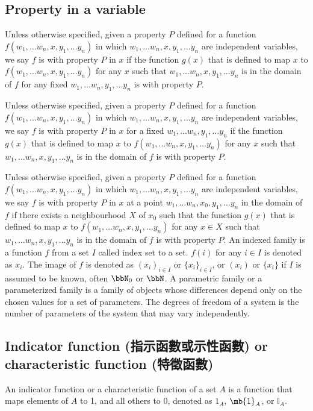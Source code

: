\documentclass[a4paper,12pt]{report}
\begin{document}
\subsection{Property in a variable}
Unless otherwise specified, given a property $P$ defined for a function $f(w_1,\dots w_n,x,y_1,\dots y_n)$ in which $w_1,\dots w_n,x,y_1,\dots y_n$ are independent variables, we say $f$ is with property $P$ in $x$ if the function $g(x)$ that is defined to map $x$ to $f(w_1,\dots w_n,x,y_1,\dots y_n)$ for any $x$ such that $w_1,\dots w_n,x,y_1,\dots y_n$ is in the domain of $f$ for any fixed $w_1,\dots w_n,y_1,\dots y_n$ is with property $P$.

Unless otherwise specified, given a property $P$ defined for a function $f(w_1,\dots w_n,x,y_1,\dots y_n)$ in which $w_1,\dots w_n,x,y_1,\dots y_n$ are independent variables, we say $f$ is with property $P$ in $x$ for a fixed $w_1,\dots w_n,y_1,\dots y_n$ if the function $g(x)$ that is defined to map $x$ to $f(w_1,\dots w_n,x,y_1,\dots y_n)$ for any $x$ such that $w_1,\dots w_n,x,y_1,\dots y_n$ is in the domain of $f$ is with property $P$.

Unless otherwise specified, given a property $P$ defined for a function $f(w_1,\dots w_n,x,y_1,\dots y_n)$ in which $w_1,\dots w_n,x,y_1,\dots y_n$ are independent variables, we say $f$ is with property $P$ in $x$ at a point $w_1,\dots w_n,x_0,y_1,\dots y_n$ in the domain of $f$ if there exists a neighbourhood $X$ of $x_0$ such that the function $g(x)$ that is defined to map $x$ to $f(w_1,\dots w_n,x,y_1,\dots y_n)$ for any $x\in X$ such that $w_1,\dots w_n,x,y_1,\dots y_n$ is in the domain of $f$ is with property $P$.
An indexed family is a function $f$ from a set $I$ called index set to a set. $f(i)$ for any $i\in I$ is denoted as $x_i$. The image of $f$ is denoted as $(x_i)_{i\in I}$ or $\{x_i\}_{i\in I}$, or $(x_i)$ or $\{x_i\}$ if $I$ is assumed to be known, often $\bbN_0$ or $\bbN$.
A parametric family or a parameterized family is a family of objects whose differences depend only on the chosen values for a set of parameters.
The degrees of freedom of a system is the number of parameters of the system that may vary independently.
\subsection{Indicator function (指示函數或示性函數) or characteristic function (特徵函數)}
An indicator function or a characteristic function of a set $A$ is a function that maps elements of $A$ to 1, and all others to 0, denoted as $1_A$, $\mb{1}_A$, or $\mathds{I}_A$.
\end{document}
